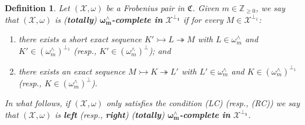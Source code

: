 \documentclass[10pt,reqno]{amsart}
\numberwithin{equation}{section}
\newtheorem{definition}{Definition}[section]
\theoremstyle{remark}
\newcommand{\X}{\mathcal{X}}
\begin{document}
\begin{definition} \label{Def-w-complete}
Let $(\mathcal{X},\omega)$ be a Frobenius pair in $\mathfrak{C}$. Given $m \in \mathbb{Z}_{\geq 0}$, we say that $(\mathcal{X},\omega)$ is (\textbf{totally}) $\bm{\omega^{\wedge}_m}$\textbf{-complete in} $\bm{\mathcal{X}^{\perp_1}}$ if for every $M \in \mathcal{X}^{\perp_1}$:
\begin{enumerate}
\item[{\sf (LC)}] there exists a short exact sequence $K' \rightarrowtail L \twoheadrightarrow M$ with $L \in \omega^\wedge_m$ and $K' \in (\omega^\wedge_m)^{\perp_1}$ (resp., $K' \in (\omega^\wedge_m)^\perp$); and

\item[{\sf (RC)}] there exists an exact sequence $M \rightarrowtail K \twoheadrightarrow L'$ with $L' \in \omega^\wedge_m$ and $K \in (\omega^\wedge_m)^{\perp_1}$ (resp., $K \in (\omega^\wedge_m)^\perp$).
\end{enumerate}
In what follows, if $(\X , \omega)$ only satisfies the condition {\sf (LC)} (resp., {\sf (RC)}) we say that $(\mathcal{X},\omega)$ is \textbf{left} (resp., \textbf{right}) (\textbf{totally}) $\bm{\omega^{\wedge}_m}$\textbf{-complete in} $\bm{\mathcal{X}^{\perp_1}}$.
\end{definition}
\end{document}
